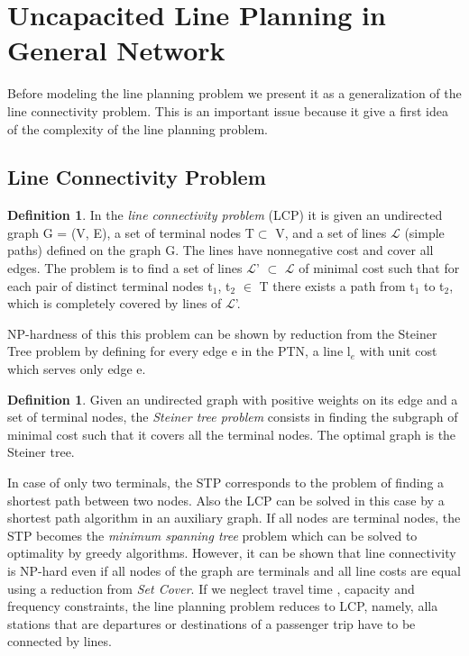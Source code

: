 \documentclass[
  twoside,
  11pt, a4paper,
  footinclude=true,
  headinclude=true,
  cleardoublepage=empty
]{book}
\theoremstyle{definition}
\newtheorem{definition}[theorem]{Definition}
\begin{document}
\section{Uncapacited Line Planning in General Network}
Before modeling the line planning problem we present it as a generalization of the line connectivity problem. This is an important issue because it give a first idea of the complexity of the line planning problem.
\subsection{Line Connectivity Problem}
\begin{definition} In the \emph{line connectivity problem} (LCP) it is given an undirected graph G = (V, E), a set of terminal nodes T$\subset$ V, and a set of lines $\mathcal{L}$ (simple paths) defined on the graph G. The lines have nonnegative cost and cover all edges. The problem is to find a set of lines $\mathcal{L}$' $\subset$ $\mathcal{L}$ of minimal cost such that for each pair of distinct terminal nodes t$_1$, t$_2$ $\in$ T there exists a path from t$_1$ to t$_2$, which is completely covered by lines of $\mathcal{L}$'.
\end{definition} 
NP-hardness of this this problem can be shown by reduction from the Steiner Tree problem by defining for every edge e in the PTN, a line l$_e$ with unit cost which serves only edge e. 
\begin{definition} Given an undirected graph with positive weights on its edge and a set of terminal nodes, the \emph{Steiner tree problem} consists in finding the subgraph of minimal cost such that it covers all the terminal nodes. The optimal graph is the Steiner tree.
\end{definition}
In case of only two terminals, the STP corresponds to the problem of finding a shortest path between two nodes. Also the LCP can be solved in this case by a shortest path algorithm in an auxiliary graph. If all nodes are terminal nodes, the STP becomes the \emph{minimum spanning tree} problem which can be solved  to optimality by greedy algorithms. \newline
However, it can be shown that line connectivity is NP-hard even if all nodes of the graph are terminals and all line costs are equal using a reduction from \emph{Set Cover}.
\newline
If we neglect travel time , capacity and frequency constraints, the line planning problem reduces to LCP, namely, alla stations that are departures or destinations of a passenger trip have to be connected by lines.
\end{document}

